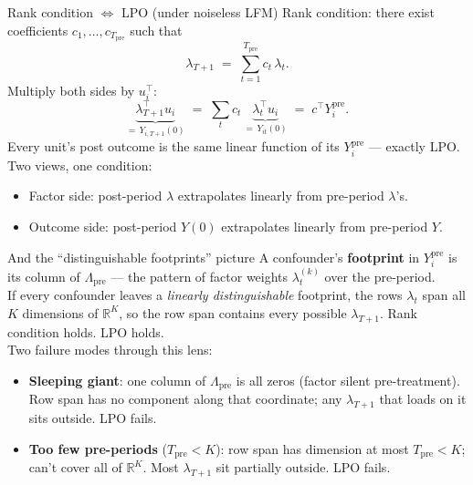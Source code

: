 \documentclass[handout,xcolor=dvipsnames,pdftex,hyperref={colorlinks=false}]{beamer}
\newcommand{\ypre}{Y^{\text{pre}}_i}      %
\newcommand{\Lpre}{\Lambda_{\text{pre}}}  %
\begin{document}
\begin{frame}{Rank condition $\Leftrightarrow$ LPO (under noiseless LFM)}
\small
Rank condition: there exist coefficients $c_1, \ldots, c_{T_{\text{pre}}}$ such that
\[
\lambda_{T+1} \;=\; \sum_{t=1}^{T_{\text{pre}}} c_t\, \lambda_t.
\]
 Multiply both sides by $u_i^\top$:
\[
\underbrace{\lambda_{T+1}^\top u_i}_{=\, Y_{i,T+1}(0)} \;=\; \sum_{t} c_t\, \underbrace{\lambda_t^\top u_i}_{=\, Y_{it}(0)} \;=\; c^\top\ypre.
\]
 Every unit's post outcome is the same linear function of its $\ypre$ --- exactly LPO.\\[1ex]
 Two views, one condition:
\begin{itemize}
  \item Factor side: post-period $\lambda$ extrapolates linearly from pre-period $\lambda$'s.
  \item Outcome side: post-period $Y(0)$ extrapolates linearly from pre-period $Y$.
\end{itemize}
\end{frame}

\begin{frame}{And the ``distinguishable footprints'' picture}
\small
A confounder's \textbf{footprint} in $\ypre$ is its column of $\Lpre$ --- the pattern of factor weights $\lambda_t^{(k)}$ over the pre-period.\\[1ex]
 If every confounder leaves a \emph{linearly distinguishable} footprint, the rows $\lambda_t$ span all $K$ dimensions of $\mathbb{R}^K$, so the row span contains every possible $\lambda_{T+1}$. Rank condition holds. LPO holds.\\[1ex]
 Two failure modes through this lens:
\begin{itemize}
  \item \textbf{Sleeping giant}: one column of $\Lpre$ is all zeros (factor silent pre-treatment). Row span has no component along that coordinate; any $\lambda_{T+1}$ that loads on it sits outside. LPO fails.
  \item \textbf{Too few pre-periods} ($T_{\text{pre}} < K$): row span has dimension at most $T_{\text{pre}} < K$; can't cover all of $\mathbb{R}^K$. Most $\lambda_{T+1}$ sit partially outside. LPO fails.
\end{itemize}
\end{frame}
\end{document}
